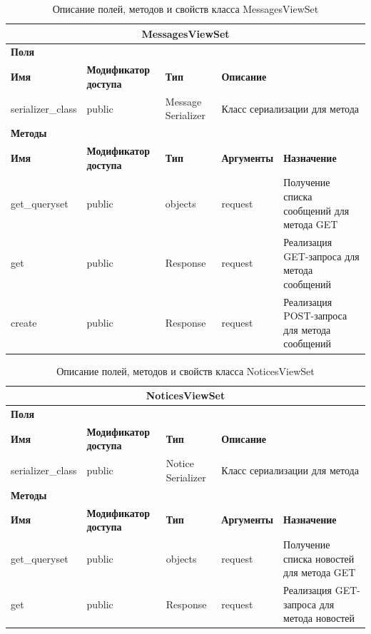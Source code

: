 \documentclass{../includes/TechDoc}
\begin{document}
    \begin{table}[ht]
        \caption{\label{tab:class-MessagesViewSet-table}Описание полей, методов и свойств класса MessagesViewSet}
        \centering
        \begin{tabular}{|p{3.2cm}|p{3cm}|p{2.9cm}|p{2.9cm}|p{4cm}|}
            \hline
            \multicolumn{5}{|c|}{MessagesViewSet} \\ \hline
            \multicolumn{5}{|l|}{\textbf{Поля}} \\ \hline
            \textbf{Имя} & \textbf{Модификатор доступа} & \textbf{Тип} & \multicolumn{2}{p{6.9cm}|}{\textbf{Описание}} \\ \hline
            serializer\_class & public & Message Serializer & \multicolumn{2}{p{6.9cm}|}{Класс сериализации для метода} \\ \hline
            \multicolumn{5}{|l|}{\textbf{Методы}} \\ \hline
            \textbf{Имя} & \textbf{Модификатор доступа} & \textbf{Тип} & \textbf{Аргументы} & \textbf{Назначение} \\ \hline
            get\_queryset & public & objects & request & Получение списка сообщений для метода GET \\ \hline
            get & public & Response & request & Реализация GET-запроса для метода сообщений \\ \hline
            create & public & Response & request & Реализация POST-запроса для метода сообщений \\ \hline
        \end{tabular}
    \end{table}

    \begin{table}[ht]
        \caption{\label{tab:class-NoticesViewSet-table}Описание полей, методов и свойств класса NoticesViewSet}
        \centering
        \begin{tabular}{|p{3.2cm}|p{3cm}|p{2.9cm}|p{2.9cm}|p{4cm}|}
            \hline
            \multicolumn{5}{|c|}{NoticesViewSet} \\ \hline
            \multicolumn{5}{|l|}{\textbf{Поля}} \\ \hline
            \textbf{Имя} & \textbf{Модификатор доступа} & \textbf{Тип} & \multicolumn{2}{p{6.9cm}|}{\textbf{Описание}} \\ \hline
            serializer\_class & public & Notice Serializer & \multicolumn{2}{p{6.9cm}|}{Класс сериализации для метода} \\ \hline
            \multicolumn{5}{|l|}{\textbf{Методы}} \\ \hline
            \textbf{Имя} & \textbf{Модификатор доступа} & \textbf{Тип} & \textbf{Аргументы} & \textbf{Назначение} \\ \hline
            get\_queryset & public & objects & request & Получение списка новостей для метода GET \\ \hline
            get & public & Response & request & Реализация GET-запроса для метода новостей \\ \hline
        \end{tabular}
    \end{table}
\end{document}
